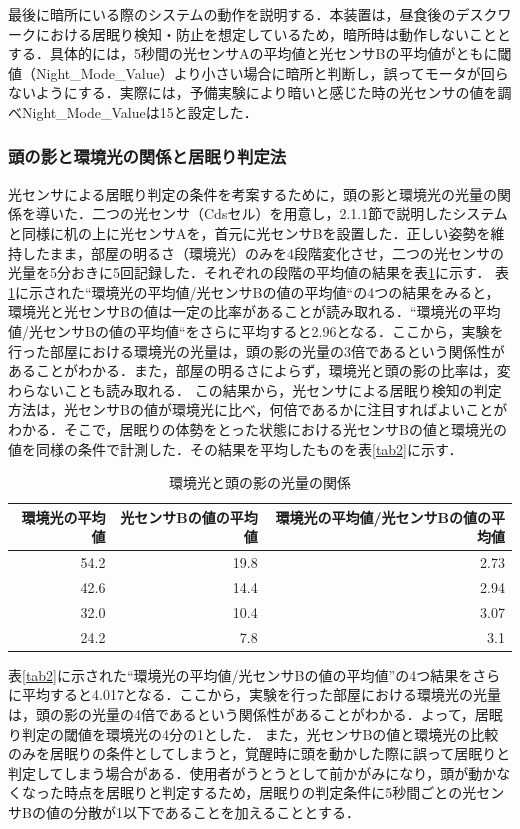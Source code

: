 最後に暗所にいる際のシステムの動作を説明する．本装置は，昼食後のデスクワークにおける居眠り検知・防止を想定しているため，暗所時は動作しないこととする．具体的には，5秒間の光センサAの平均値と光センサBの平均値がともに閾値（Night\_Mode\_Value）より小さい場合に暗所と判断し，誤ってモータが回らないようにする．実際には，予備実験により暗いと感じた時の光センサの値を調べNight\_Mode\_Valueは15と設定した．

\subsubsection{頭の影と環境光の関係と居眠り判定法}

光センサによる居眠り判定の条件を考案するために，頭の影と環境光の光量の関係を導いた．二つの光センサ（Cdsセル）を用意し，2.1.1節で説明したシステムと同様に机の上に光センサAを，首元に光センサBを設置した．正しい姿勢を維持したまま，部屋の明るさ（環境光）のみを4段階変化させ，二つの光センサの光量を5分おきに5回記録した．それぞれの段階の平均値の結果を表\ref{tab1}に示す．
表\ref{tab1}に示された“環境光の平均値/光センサBの値の平均値“の4つの結果をみると，環境光と光センサBの値は一定の比率があることが読み取れる．“環境光の平均値/光センサBの値の平均値“をさらに平均すると2.96となる．ここから，実験を行った部屋における環境光の光量は，頭の影の光量の3倍であるという関係性があることがわかる．また，部屋の明るさによらず，環境光と頭の影の比率は，変わらないことも読み取れる．
この結果から，光センサによる居眠り検知の判定方法は，光センサBの値が環境光に比べ，何倍であるかに注目すればよいことがわかる．そこで，居眠りの体勢をとった状態における光センサBの値と環境光の値を同様の条件で計測した．その結果を平均したものを表\ref{tab2}に示す．

\begin{table}[bt]
\caption{環境光と頭の影の光量の関係}
\label{tab1}
\begin{tabular}{|r|r|r|}\hline
環境光の平均値&光センサBの値の平均値&環境光の平均値/光センサBの値の平均値\\ \hline
54.2&19.8&2.73\\
42.6&14.4&2.94\\
32.0&10.4&3.07\\
24.2&7.8&3.1\\ \hline
\end{tabular}
\end{table}


表\ref{tab2}に示された“環境光の平均値/光センサBの値の平均値”の4つ結果をさらに平均すると4.017となる．ここから，実験を行った部屋における環境光の光量は，頭の影の光量の4倍であるという関係性があることがわかる．よって，居眠り判定の閾値を環境光の4分の1とした．
また，光センサBの値と環境光の比較のみを居眠りの条件としてしまうと，覚醒時に頭を動かした際に誤って居眠りと判定してしまう場合がある．使用者がうとうとして前かがみになり，頭が動かなくなった時点を居眠りと判定するため，居眠りの判定条件に5秒間ごとの光センサBの値の分散が1以下であることを加えることとする．

